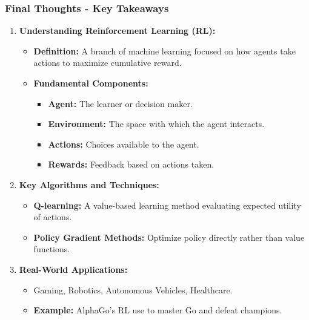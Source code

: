 \documentclass[aspectratio=169]{beamer}
\begin{document}
\begin{frame}[fragile]
    \frametitle{Final Thoughts - Key Takeaways}
    
    \begin{enumerate}
        \item \textbf{Understanding Reinforcement Learning (RL):}
        \begin{itemize}
            \item \textbf{Definition:} A branch of machine learning focused on how agents take actions to maximize cumulative reward.
            \item \textbf{Fundamental Components:}
            \begin{itemize}
                \item \textbf{Agent:} The learner or decision maker.
                \item \textbf{Environment:} The space with which the agent interacts.
                \item \textbf{Actions:} Choices available to the agent.
                \item \textbf{Rewards:} Feedback based on actions taken.
            \end{itemize}
        \end{itemize}
        
        \item \textbf{Key Algorithms and Techniques:}
        \begin{itemize}
            \item \textbf{Q-learning:} A value-based learning method evaluating expected utility of actions.
            \item \textbf{Policy Gradient Methods:} Optimize policy directly rather than value functions.
        \end{itemize}
        
        \item \textbf{Real-World Applications:}
        \begin{itemize}
            \item Gaming, Robotics, Autonomous Vehicles, Healthcare.
            \item \textbf{Example:} AlphaGo's RL use to master Go and defeat champions.
        \end{itemize}
    \end{enumerate}
\end{frame}
\end{document}
